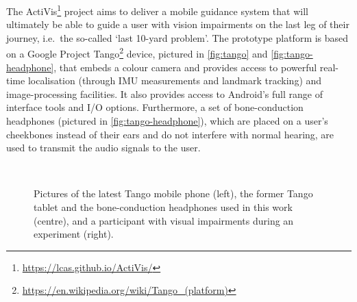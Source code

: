 \documentclass{llncs}
\begin{document}
The ActiVis\footnote{\url{https://lcas.github.io/ActiVis/}} project aims to deliver a mobile guidance system that will ultimately be able to guide a user with vision impairments on the last leg of their journey, i.e.\ the so-called `last 10-yard problem'. 
The prototype platform is based on a Google Project Tango\footnote{\url{https://en.wikipedia.org/wiki/Tango\_(platform)}} device, pictured in \cref{fig:tango} and \cref{fig:tango-headphone}, that embeds a colour camera and provides access to powerful real-time localisation (through IMU measurements and landmark tracking) and image-processing facilities. 
It also provides access to Android's full range of interface tools and I/O options. 
Furthermore, a set of bone-conduction headphones (pictured in \cref{fig:tango-headphone}), which are placed on a user's cheekbones instead of their ears and do not interfere with normal hearing, are used to transmit the audio signals to the user.

\begin{figure}[t]
  \centering
~
~
  \caption{Pictures of the latest Tango mobile phone (left), the former Tango tablet and the bone-conduction headphones used in this work (centre), and a participant with visual impairments during an experiment (right).}
\end{figure}
\end{document}
